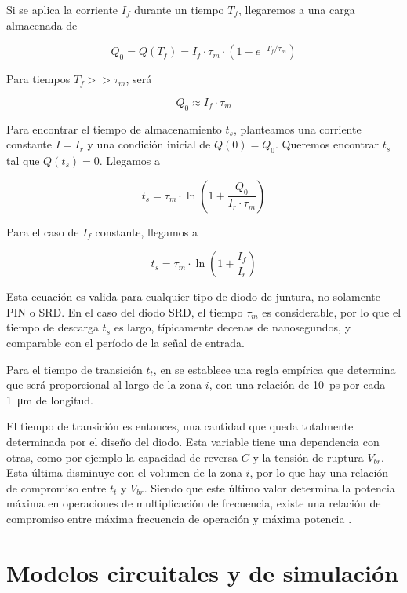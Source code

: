 Si se aplica la corriente $I_f$ durante un tiempo $T_f$, llegaremos a una carga
almacenada de

\begin{equation}
    Q_0 = Q(T_f) = I_f \cdot \tau_m \cdot \left( 1-e^{-T_f/\tau_m}\right)
\end{equation}

Para tiempos $T_f >> \tau_m$, será

\begin{equation}
    Q_0 \approx I_f \cdot \tau_m
\end{equation}

Para encontrar el tiempo de almacenamiento $t_s$, planteamos una corriente
constante $I=I_r$ y una condición inicial de $Q(0)=Q_0$. Queremos encontrar
$t_s$ tal que $Q(t_s) = 0$. Llegamos a

\begin{equation}
    t_s = \tau_m \cdot \ln \left( 1+\frac{Q_0}{I_r \cdot \tau_m}\right)
\end{equation}

Para el caso de $I_f$ constante, llegamos a

\begin{equation}
    t_s = \tau_m \cdot \ln \left( 1+\frac{I_f}{I_r}\right)
\end{equation}

Esta ecuación es valida para cualquier tipo de diodo de juntura, no solamente
PIN o SRD. En el caso del diodo SRD, el tiempo $\tau_m$ es considerable, por lo
que el tiempo de descarga $t_s$ es largo, típicamente decenas de nanosegundos, y comparable con el período de la señal de entrada.

Para el tiempo de transición $t_t$, en \cite{moll1969} se establece una regla
empírica que determina que será proporcional al largo de la zona $i$, con una
relación de \qty{10}{\pico\second} por cada \qty{1}{\micro\meter} de longitud.

El tiempo de transición es entonces, una cantidad que queda totalmente
determinada por el diseño del diodo. Esta variable tiene una dependencia con
otras, como por ejemplo la capacidad de reversa $C$ y la tensión de ruptura
$V_{br}$. Esta última disminuye con el volumen de la zona $i$, por lo que hay
una relación de compromiso entre $t_t$ y $V_{br}$. Siendo que este último valor
determina la potencia máxima en operaciones de multiplicación de frecuencia,
existe una relación de compromiso entre máxima frecuencia de operación y máxima
potencia \cite{moll1969}.

\section{Modelos circuitales y de simulación}
\label{sec:srd_simulation_models}

